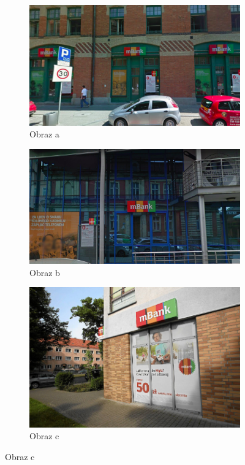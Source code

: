 \begin{figure}[h]
\begin{subfigure}{.5\textwidth}
  \centering
  \includegraphics[width=.8\linewidth]{figures/img1.png}
  \caption{Obraz a}
  \label{fig:sfig1}
\end{subfigure}%
\begin{subfigure}{.5\textwidth}
  \centering
  \includegraphics[width=.8\linewidth]{figures/img2.png}
  \caption{Obraz b}
  \label{fig:sfig2}
\end{subfigure}
\begin{subfigure}{.5\textwidth}
  \centering
  \includegraphics[width=.8\linewidth]{figures/img3.png}
  \caption{Obraz c}
  \label{fig:sfig2}
\end{subfigure}

\end{figure}
